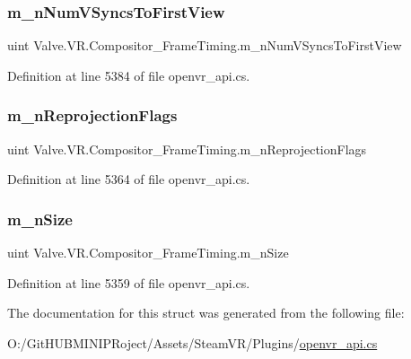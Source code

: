 \subsubsection{\texorpdfstring{m\_nNumVSyncsToFirstView}{m\_nNumVSyncsToFirstView}}
{\footnotesize\ttfamily uint Valve.\+V\+R.\+Compositor\+\_\+\+Frame\+Timing.\+m\+\_\+n\+Num\+V\+Syncs\+To\+First\+View}



Definition at line 5384 of file openvr\+\_\+api.\+cs.

\mbox{\label{struct_valve_1_1_v_r_1_1_compositor___frame_timing_a011ef9557833a41a946cc3fe1e16f5e2}} 
\subsubsection{\texorpdfstring{m\_nReprojectionFlags}{m\_nReprojectionFlags}}
{\footnotesize\ttfamily uint Valve.\+V\+R.\+Compositor\+\_\+\+Frame\+Timing.\+m\+\_\+n\+Reprojection\+Flags}



Definition at line 5364 of file openvr\+\_\+api.\+cs.

\mbox{\label{struct_valve_1_1_v_r_1_1_compositor___frame_timing_a016bda0a11d847916110b85b0c04f595}} 
\subsubsection{\texorpdfstring{m\_nSize}{m\_nSize}}
{\footnotesize\ttfamily uint Valve.\+V\+R.\+Compositor\+\_\+\+Frame\+Timing.\+m\+\_\+n\+Size}



Definition at line 5359 of file openvr\+\_\+api.\+cs.



The documentation for this struct was generated from the following file\+:\begin{DoxyCompactItemize}
\item 
O\+:/\+Git\+H\+U\+B\+M\+I\+N\+I\+P\+Roject/\+Assets/\+Steam\+V\+R/\+Plugins/\mbox{\hyperlink{openvr__api_8cs}{openvr\+\_\+api.\+cs}}\end{DoxyCompactItemize}
